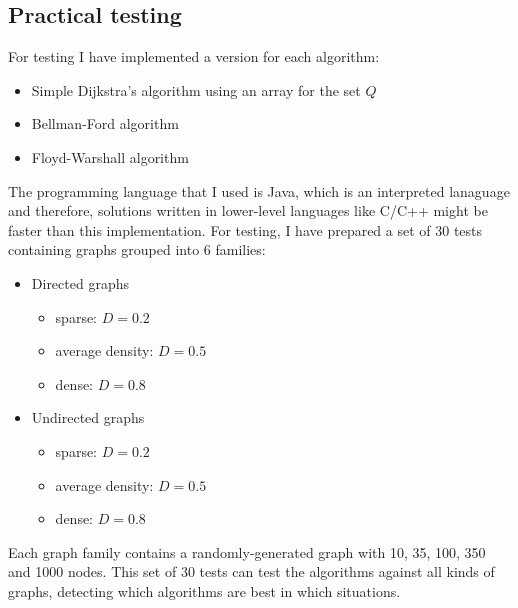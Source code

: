 \documentclass[runningheads]{llncs}
\begin{document}
\subsection{Practical testing}
For testing I have implemented a version for each algorithm:
\begin{itemize}
	\item Simple Dijkstra's algorithm using an array for the set $Q$
	\item Bellman-Ford algorithm
	\item Floyd-Warshall algorithm
\end{itemize}

The programming language that I used is Java, which is an interpreted lanaguage and therefore, solutions written in lower-level languages like C/C++ might be faster than this implementation. For testing, I have prepared a set of 30 tests containing graphs grouped into 6 families:
\begin{itemize}
	\item Directed graphs
	\begin{itemize}
		\item sparse: $D=0.2$
		\item average density: $D=0.5$
		\item dense: $D=0.8$
	\end{itemize}
	\item Undirected graphs
	\begin{itemize}
		\item sparse: $D=0.2$
		\item average density: $D=0.5$
		\item dense: $D=0.8$
	\end{itemize}
\end{itemize}

Each graph family contains a randomly-generated graph with 10, 35, 100, 350 and 1000 nodes. This set of 30 tests can test the algorithms against all kinds of graphs, detecting which algorithms are best in which situations.
\end{document}
